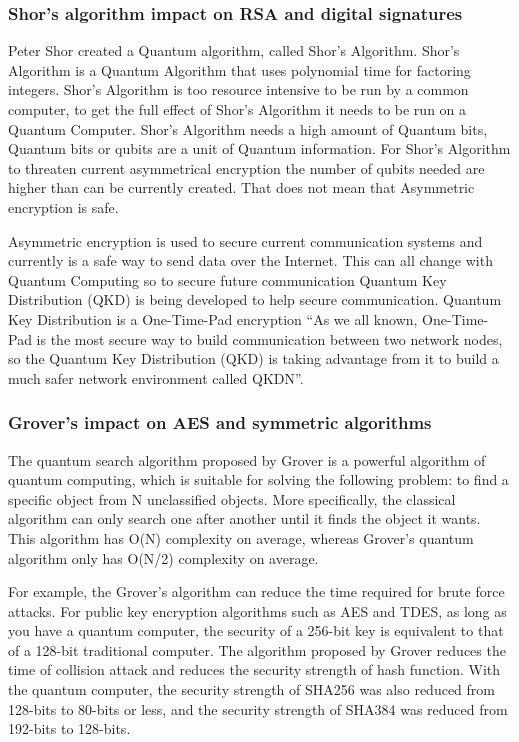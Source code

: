 \documentclass[sigconf]{acmart}
\begin{document}
\subsubsection{Shor's algorithm impact on RSA and digital signatures}
Peter Shor created a Quantum algorithm, called Shor’s Algorithm. Shor’s Algorithm is a Quantum Algorithm that uses polynomial time for factoring integers. Shor’s Algorithm is too resource intensive to be run by a common computer, to get the full effect of Shor’s Algorithm it needs to be run on a Quantum Computer. Shor’s Algorithm needs a high amount of Quantum bits, Quantum bits or qubits are a unit of Quantum information. For Shor’s Algorithm to threaten current asymmetrical encryption the number of qubits needed are higher than can be currently created. That does not mean that Asymmetric encryption is safe.\cite{shor_polynomial-time_1997}
 
Asymmetric encryption is used to secure current communication systems and currently is a safe way to send data over the Internet. This can all change with Quantum Computing so to secure future communication Quantum Key Distribution (QKD) is being developed to help secure communication. Quantum Key Distribution is a One-Time-Pad encryption “As we all known, One-Time-Pad is the most secure way to build communication between two network nodes, so the Quantum Key Distribution (QKD) is taking advantage from it to build a much safer network environment called QKDN”\cite{liu_multi-path_2019}. 

\subsubsection{Grover's impact on AES and symmetric algorithms}
The quantum search algorithm proposed by Grover is a powerful algorithm of quantum computing, which is suitable for solving the following problem: to find a specific object from N unclassified objects. More specifically, the classical algorithm can only search one after another until it finds the object it wants. This algorithm has O(N) complexity on average, whereas Grover's quantum algorithm only has O(N/2) complexity on average\cite{canteaut_implementing_2020}.

For example, the Grover’s algorithm can reduce the time required for brute force attacks. For public key encryption algorithms such as AES and TDES, as long as you have a quantum computer, the security of a 256-bit key is equivalent to that of a 128-bit traditional computer. The algorithm proposed by Grover reduces the time of collision attack and reduces the security strength of hash function. With the quantum computer, the security strength of SHA256 was also reduced from 128-bits to 80-bits or less, and the security strength of SHA384 was reduced from 192-bits to 128-bits\cite{takagi_applying_2016}.
\end{document}
